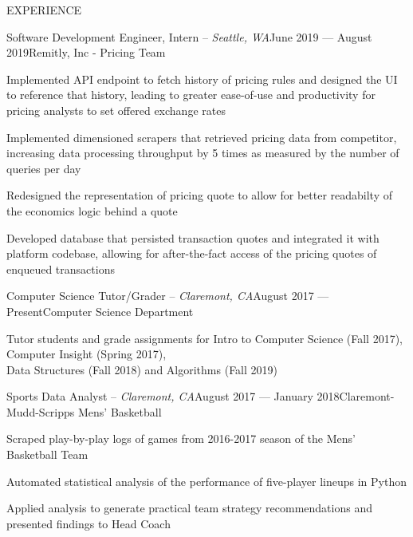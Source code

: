 \documentclass{resume} %
\begin{document}
\begin{rSection}{EXPERIENCE}
\begin{rSubsection}{Software
Development Engineer, Intern -- {\it Seattle, WA}}{June 2019 --- August 2019}{Remitly, Inc - Pricing Team}

\item Implemented API endpoint to fetch history of pricing rules and designed the UI to reference that history, leading to greater ease-of-use and productivity for pricing analysts to set offered exchange rates
\item Implemented dimensioned scrapers that retrieved pricing data from competitor, increasing data processing throughput by 5 times as measured by the number of queries per day
\item Redesigned the representation of pricing quote to allow for better readabilty of the economics logic behind a quote
\item Developed database that persisted transaction quotes and integrated it with platform codebase, allowing for after-the-fact access of the pricing quotes of enqueued transactions

\end{rSubsection}
\begin{rSubsection}{Computer Science Tutor/Grader -- {\it Claremont, CA}}{August 2017 --- Present}{Computer Science Department}

\item Tutor students and grade assignments for Intro to Computer Science (Fall 2017), Computer Insight (Spring 2017),\\Data Structures (Fall 2018) and Algorithms (Fall 2019)
\end{rSubsection}

\begin{rSubsection}{Sports Data Analyst -- {\it Claremont, CA}}{August 2017 --- January 2018}{Claremont-Mudd-Scripps Mens' Basketball}

\item Scraped play-by-play logs of games from 2016-2017 season of the Mens' Basketball Team
\item Automated statistical analysis of the performance of five-player lineups in Python
\item Applied analysis to generate practical team strategy recommendations and presented findings to Head Coach

\end{rSubsection}
\end{rSection}
\end{document}
